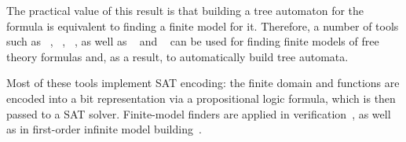 The practical value of this result is that building a tree automaton for the formula is equivalent to finding a finite model for it. Therefore, a number of tools such as \mace{}~\cite{https://doi.org/10.48550/arxiv.cs/0310055}, \kodkod{}~\cite{10.1007/978-3-540-71209-1_49}, \paradox{}~\cite{claessen2003new}, as well as \cvc{}~\cite{reynolds2013finite} and \vampire{}~\cite{10.1007/978-3-319-40970-2_20} can be used for finding finite models of free theory formulas and, as a result, to automatically build tree automata.


Most of these tools implement SAT encoding: the finite domain and functions are encoded into a bit representation via a propositional logic formula, which is then passed to a SAT solver.
Finite-model finders are applied in verification~\cite{lisitsa2012finite}, as well as in first-order infinite model building~\cite{peltier2009constructing}.

